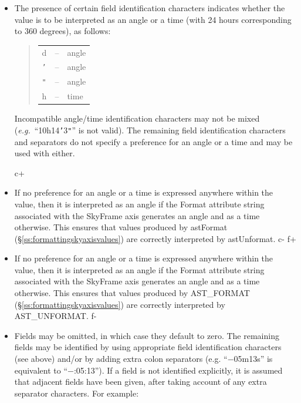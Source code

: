 \documentclass[twoside,11pt]{article}
\newcommand{\secref}[1]{\S\ref{#1}}
\newcommand{\secref}[1]{\ref{#1}}
\begin{document}
\begin{itemize}
\item The presence of certain field identification characters
indicates whether the value is to be interpreted as an angle or a time
(with 24 hours corresponding to 360 degrees), as follows:

\begin{quote}
\begin{tabular}{lll}
d & -- & angle \\
{\tt{'}} & -- & angle \\
{\tt{"}} & -- & angle \\
h & -- & time
\end{tabular}
\end{quote}

Incompatible angle/time identification characters may not be mixed
({\em{e.g.}}\ ``10h14{\tt{'}}3{\tt{"}}'' is not valid).  The remaining
field identification characters and separators do not specify a
preference for an angle or a time and may be used with either.

c+
\item If no preference for an angle or a time is expressed anywhere
within the value, then it is interpreted as an angle if the Format
attribute string associated with the SkyFrame axis generates an angle
and as a time otherwise.  This ensures that values produced by
astFormat (\secref{ss:formattingskyaxisvalues}) are correctly
interpreted by astUnformat.
c-
f+
\item If no preference for an angle or a time is expressed anywhere
within the value, then it is interpreted as an angle if the Format
attribute string associated with the SkyFrame axis generates an angle
and as a time otherwise.  This ensures that values produced by
AST\_FORMAT (\secref{ss:formattingskyaxisvalues}) are correctly
interpreted by AST\_UNFORMAT.
f-

\item Fields may be omitted, in which case they default to zero. The
remaining fields may be identified by using appropriate field
identification characters (see above) and/or by adding extra colon
separators (e.g. ``$-$05m13s'' is equivalent to ``$-$:05:13''). If a field
is not identified explicitly, it is assumed that adjacent fields have
been given, after taking account of any extra separator
characters. For example:


\end{itemize}
\end{document}
